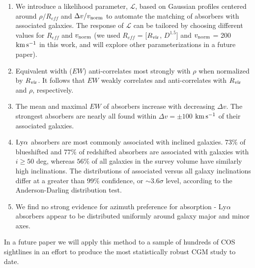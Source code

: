 \vspace{10pt}

\begin{enumerate}

\item We introduce a likelihood parameter, $\mathcal{L}$, based on Gaussian profiles centered around $\rho / R_{eff}$ and $\Delta v / v_{\rm norm}$ to automate the matching of absorbers with associated galaxies. The response of $\mathcal{L}$ can be tailored by choosing different values for $R_{eff}$ and $v_{\rm norm}$ (we used $R_{eff}$ = [$R_{\rm vir}$, $D^{1.5}$] and $v_{\rm norm}$ = 200 $\rm km\, s^{-1}$ in this work, and will explore other parameterizations in a future paper).

\item Equivalent width ($EW$) anti-correlates most strongly with $\rho$ when normalized by $R_{\rm vir}$. It follows that $EW$ weakly correlates and anti-correlates with $R_{\rm vir}$ and $\rho$, respectively.

\item The mean and maximal $EW$ of absorbers increase with decreasing $\Delta v$. The strongest absorbers are nearly all found within $\Delta v = \pm 100$ $\rm km\, s^{-1}$ of their associated galaxies.

\item $\rm Ly\alpha$ absorbers are most commonly associated with inclined galaxies. $73\%$ of blueshifted and $77\%$ of redshifted absorbers are associated with galaxies with $i \geq 50$ deg, whereas $56\%$ of all galaxies in the survey volume have similarly high inclinations. The distributions of associated versus all galaxy inclinations differ at a greater than $99\%$ confidence, or $\sim 3.6\sigma$ level, according to the Anderson-Darling distribution test.

\item We find no strong evidence for azimuth preference for absorption - Ly$\alpha$ absorbers appear to be distributed uniformly around galaxy major and minor axes.

\end{enumerate}

In a future paper we will apply this method to a sample of hundreds of COS sightlines in an effort to produce the most statistically robust CGM study to date.


\acknowledgements

